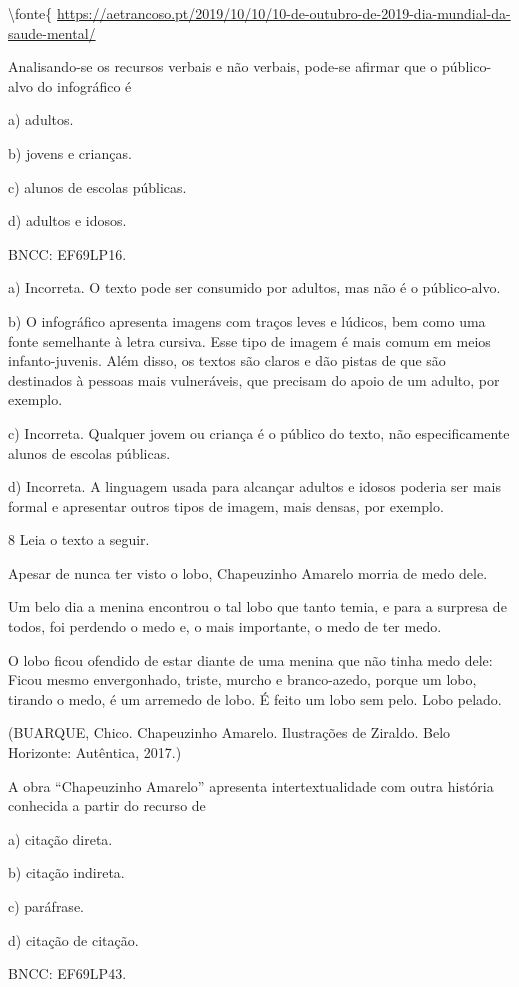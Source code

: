 {\textbackslash fonte\{
\url{https://aetrancoso.pt/2019/10/10/10-de-outubro-de-2019-dia-mundial-da-saude-mental/}

Analisando-se os recursos verbais e não verbais, pode-se afirmar que o
público-alvo do infográfico é

a) adultos.

b) jovens e crianças.

c) alunos de escolas públicas.

d) adultos e idosos.

BNCC: EF69LP16.

a) Incorreta. O texto pode ser consumido por adultos, mas não é o
público-alvo.

b) O infográfico apresenta imagens com traços leves e lúdicos, bem como
uma fonte semelhante à letra cursiva. Esse tipo de imagem é mais comum
em meios infanto-juvenis. Além disso, os textos são claros e dão pistas
de que são destinados à pessoas mais vulneráveis, que precisam do apoio
de um adulto, por exemplo.

c) Incorreta. Qualquer jovem ou criança é o público do texto, não
especificamente alunos de escolas públicas.

d) Incorreta. A linguagem usada para alcançar adultos e idosos poderia
ser mais formal e apresentar outros tipos de imagem, mais densas, por
exemplo.

\num{8} Leia o texto a seguir.

Apesar de nunca ter visto o lobo, Chapeuzinho Amarelo morria de medo
dele.

Um belo dia a menina encontrou o tal lobo que tanto temia, e para a
surpresa de todos, foi perdendo o medo e, o mais importante, o medo de
ter medo.

O lobo ficou ofendido de estar diante de uma menina que não tinha medo
dele: Ficou mesmo envergonhado, triste, murcho e branco-azedo, porque um
lobo, tirando o medo, é um arremedo de lobo. É feito um lobo sem pelo.
Lobo pelado.

(BUARQUE, Chico. Chapeuzinho Amarelo. Ilustrações de Ziraldo. Belo
Horizonte: Autêntica, 2017.)

A obra ``Chapeuzinho Amarelo'' apresenta intertextualidade com outra
história conhecida a partir do recurso de

a) citação direta.

b) citação indireta.

c) paráfrase.

d) citação de citação.

BNCC: EF69LP43.

}
